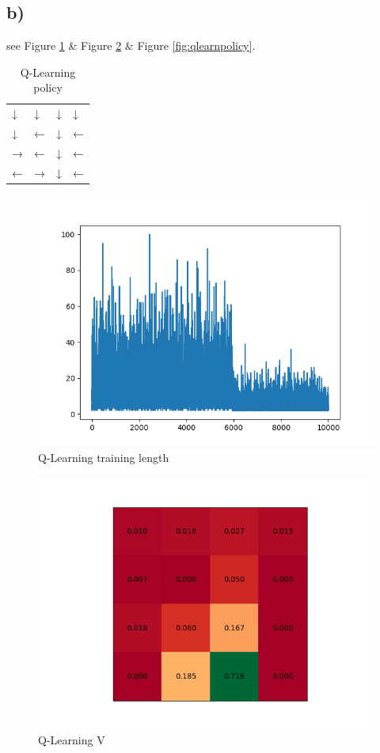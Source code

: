 \documentclass[a4paper]{article}
\begin{document}
\subsection*{b)}
see Figure \ref{fig:qlearnlength} \& Figure \ref{fig:qlearnreward} \& Figure \ref{fig:qlearnpolicy}.

\begin{table}[!ht]
	\centering
	\begin{tabular}{llll}
		↓ & ↓ & ↓ & ↓ \\
		↓ & ← & ↓ & ← \\
		→ & ← & ↓ & ← \\
		← & → & ↓ & ←
	\end{tabular}
	\caption{Q-Learning policy}
\end{table}

\begin{figure}
	\centering
	\includegraphics[width=0.8\linewidth]{4x4_qlearn_length}
	\caption{Q-Learning training length}
	\label{fig:qlearnlength}
\end{figure}
\begin{figure}
	\centering
	\includegraphics[width=0.6\linewidth]{4x4_qlearn_v}
	\caption{Q-Learning V}
	\label{fig:qlearnreward}
\end{figure}
\end{document}
